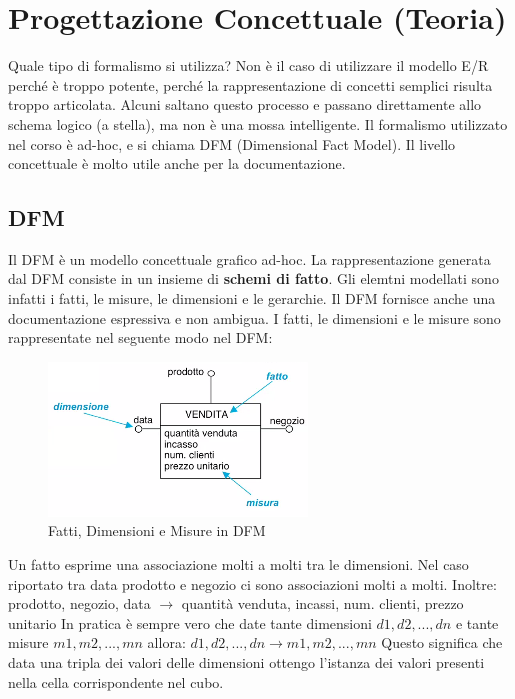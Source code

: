 
\section{Progettazione Concettuale (Teoria)}
Quale tipo di formalismo si utilizza? Non è il caso di utilizzare il modello E/R perché è troppo potente, perché la rappresentazione di concetti semplici risulta troppo articolata.\newline
Alcuni saltano questo processo e passano direttamente allo schema logico (a stella), ma non è una mossa intelligente.\newline
Il formalismo utilizzato nel corso è ad-hoc, e si chiama DFM (Dimensional Fact Model).
Il livello concettuale è molto utile anche per la documentazione.
\subsection{DFM}
Il DFM è un modello concettuale grafico ad-hoc. La rappresentazione generata dal DFM consiste in un insieme di \textbf{schemi di fatto}. Gli elemtni modellati sono infatti i fatti, le misure, le dimensioni e le gerarchie. Il DFM fornisce anche una documentazione espressiva e non ambigua.\newline
I fatti, le dimensioni e le misure sono rappresentate nel seguente modo nel DFM:
\begin{figure}[H]
	\begin{center}
		\includegraphics[width=0.5\linewidth]{img/dfm.png}
		\caption{Fatti, Dimensioni e Misure in DFM}
	\end{center}
\end{figure}
\noindent Un fatto esprime una associazione molti a molti tra le dimensioni. Nel caso riportato tra data prodotto e negozio ci sono associazioni molti a molti. Inoltre:\newline
prodotto, negozio, data $ \xrightarrow{} $ quantità venduta, incassi, num. clienti, prezzo unitario\newline
In pratica è sempre vero che date tante dimensioni $d1, d2, ..., dn$ e tante misure $m1, m2, ..., mn$ allora:
$d1, d2, ..., dn \xrightarrow{} m1, m2, ..., mn$
Questo significa che data una tripla dei valori delle dimensioni ottengo l'istanza dei valori presenti nella cella corrispondente nel cubo.\newline
